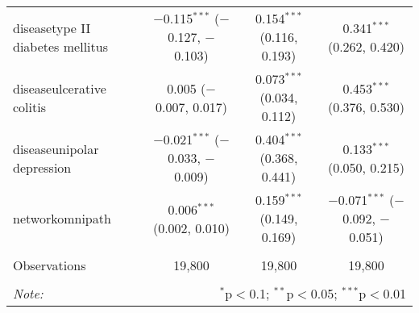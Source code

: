 \begin{table}[!htbp]
\begin{tabular}{@{\extracolsep{5pt}}lccc}
  diseasetype II diabetes mellitus & $-$0.115$^{***}$ ($-$0.127, $-$0.103) & 0.154$^{***}$ (0.116, 0.193) & 0.341$^{***}$ (0.262, 0.420) \\ 
  diseaseulcerative colitis & 0.005 ($-$0.007, 0.017) & 0.073$^{***}$ (0.034, 0.112) & 0.453$^{***}$ (0.376, 0.530) \\ 
  diseaseunipolar depression & $-$0.021$^{***}$ ($-$0.033, $-$0.009) & 0.404$^{***}$ (0.368, 0.441) & 0.133$^{***}$ (0.050, 0.215) \\ 
  networkomnipath & 0.006$^{***}$ (0.002, 0.010) & 0.159$^{***}$ (0.149, 0.169) & $-$0.071$^{***}$ ($-$0.092, $-$0.051) \\ 
 \hline \\[-1.8ex] 
Observations & 19,800 & 19,800 & 19,800 \\ 
\hline 
\hline \\[-1.8ex] 
\textit{Note:}  & \multicolumn{3}{r}{$^{*}$p$<$0.1; $^{**}$p$<$0.05; $^{***}$p$<$0.01} \\ 
\end{tabular} 
\end{table} 
